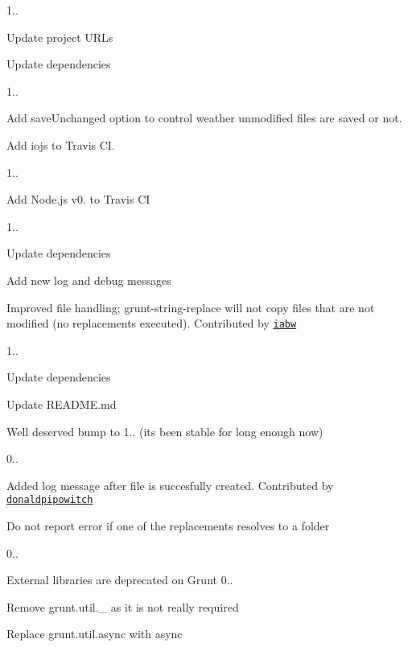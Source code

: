 1..
\begin{DoxyItemize}
\item Update project U\+R\+Ls
\item Update dependencies
\end{DoxyItemize}

1..
\begin{DoxyItemize}
\item Add {\ttfamily save\+Unchanged} option to control weather unmodified files are saved or not.
\item Add iojs to Travis CI.
\end{DoxyItemize}

1..
\begin{DoxyItemize}
\item Add Node.\+js v0. to Travis CI
\end{DoxyItemize}

1..
\begin{DoxyItemize}
\item Update dependencies
\item Add new log and debug messages
\item Improved file handling; grunt-\/string-\/replace will not copy files that are not modified (no replacements executed). Contributed by \href{https://github.com/iabw}{\tt iabw}
\end{DoxyItemize}

1..
\begin{DoxyItemize}
\item Update dependencies
\item Update R\+E\+A\+D\+M\+E.\+md
\item Well deserved bump to 1.. (its been stable for long enough now)
\end{DoxyItemize}

0..
\begin{DoxyItemize}
\item Added log message after file is succesfully created. Contributed by \href{https://github.com/donaldpipowitch}{\tt donaldpipowitch}
\item Do not report error if one of the replacements resolves to a folder
\end{DoxyItemize}

0..
\begin{DoxyItemize}
\item External libraries are deprecated on Grunt 0..
\begin{DoxyItemize}
\item Remove grunt.\+util.\+\_\+ as it is not really required
\item Replace grunt.\+util.\+async with async
\end{DoxyItemize}
\end{DoxyItemize}

